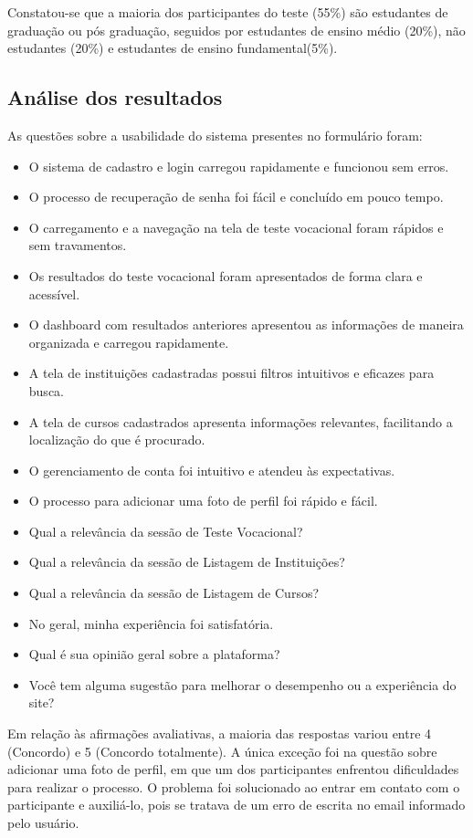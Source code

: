 Constatou-se que a maioria dos participantes do teste (55\%) são estudantes de graduação ou pós graduação, seguidos por estudantes de ensino médio (20\%), não estudantes (20\%) e estudantes de ensino fundamental(5\%). 

\subsection{Análise dos resultados}
As questões sobre a usabilidade do sistema presentes no formulário foram:

\begin{itemize} \item O sistema de cadastro e login carregou rapidamente e funcionou sem erros.
\item O processo de recuperação de senha foi fácil e concluído em pouco tempo.
\item O carregamento e a navegação na tela de teste vocacional foram rápidos e sem travamentos.
\item Os resultados do teste vocacional foram apresentados de forma clara e acessível.
\item O dashboard com resultados anteriores apresentou as informações de maneira organizada e carregou rapidamente.
\item A tela de instituições cadastradas possui filtros intuitivos e eficazes para busca.
\item A tela de cursos cadastrados apresenta informações relevantes, facilitando a localização do que é procurado.
\item O gerenciamento de conta foi intuitivo e atendeu às expectativas.
\item O processo para adicionar uma foto de perfil foi rápido e fácil.
\item Qual a relevância da sessão de Teste Vocacional?
\item Qual a relevância da sessão de Listagem de Instituições?
\item Qual a relevância da sessão de Listagem de Cursos?
\item No geral, minha experiência foi satisfatória.
\item Qual é sua opinião geral sobre a plataforma?
\item Você tem alguma sugestão para melhorar o desempenho ou a experiência do site?
\end{itemize}

Em relação às afirmações avaliativas, a maioria das respostas variou entre 4 (Concordo) e 5 (Concordo totalmente). A única exceção foi na questão sobre adicionar uma foto de perfil, em que um dos participantes enfrentou dificuldades para realizar o processo. O problema foi solucionado ao entrar em contato com o participante e auxiliá-lo, pois se tratava de um erro de escrita no email informado pelo usuário.

